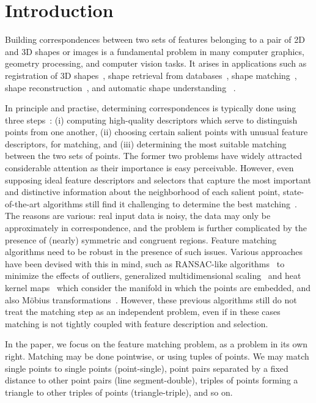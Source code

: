 \section{Introduction}
\label{sec:introduction}

Building correspondences between two sets of features belonging to a pair of 2D and 3D shapes or images
is a fundamental problem in many computer graphics, geometry processing, and computer vision tasks.
It arises in applications such as
registration of 3D shapes~\cite{Gelfand05,Aiger08,li08,Zeng10,vanKaick11,Chang11},
shape retrieval from databases~\cite{Bronstein11},
shape matching~\cite{Berg05,Brown07,Lorenzo08,Tevs09,Ovsjanikov10,Tevs11,SahilliogluY11,Windheuser11},
shape reconstruction~\cite{Brown07,Pekelny08,Wand09,Chang11},
and automatic shape understanding~\cite{Lipman09,Sun10,Kim11} .

In principle and practise, determining correspondences is typically done using three steps~\cite{Johnson99,Lowe04,Sun09,Bokeloh08,Toler10,Leutenegger11}:
(i) computing high-quality descriptors which serve to distinguish points from one another,
(ii) choosing certain salient points with unusual feature descriptors, for matching,
and (iii) determining the most suitable matching between the two sets of points.
The former two problems have widely attracted considerable attention as their importance is easy perceivable.
However, even supposing ideal feature  descriptors and selectors  that capture the most important and distinctive information about the neighborhood of each salient point,
state-of-the-art algorithms  still find it challenging to determine the best matching~\cite{vanKaick11}.
The reasons are various:  real input data is noisy, the data may only be approximately in correspondence, 
and the problem is further complicated by the presence of (nearly) symmetric and congruent regions.
Feature matching algorithms need to be robust in the presence of such issues.
Various approaches have been devised with this in mind,
such as RANSAC-like algorithms~\cite{Tevs09,Tevs11} to minimize the effects of outliers,
generalized multidimensional scaling~\cite{Bronstein11} and
heat kernel maps~\cite{Ovsjanikov10} which consider the manifold in which the points are embedded, and also M{\"o}bius transformations~\cite{Lipman09,Kim11}.
However, these previous algorithms still do not treat the matching step as an independent problem, even if in these cases matching is not tightly coupled with feature description and selection.

In the paper, we focus on the feature matching problem, as a problem in its own right.
Matching may be done pointwise, or using tuples of points.
We may match single points to single points (point-single),
point pairs separated by a fixed distance to other point pairs (line segment-double),
triples of points forming a triangle to other triples of points (triangle-triple), and so on.

